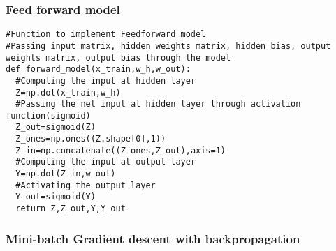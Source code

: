 \documentclass[12pt,letterpaper, onecolumn]{exam}
\begin{document}
 \newpage 
 \subsubsection*{ Feed forward model}

\begin{lstlisting}
#Function to implement Feedforward model
#Passing input matrix, hidden weights matrix, hidden bias, output weights matrix, output bias through the model   
def forward_model(x_train,w_h,w_out):
  #Computing the input at hidden layer
  Z=np.dot(x_train,w_h)
  #Passing the net input at hidden layer through activation function(sigmoid)
  Z_out=sigmoid(Z)
  Z_ones=np.ones((Z.shape[0],1))
  Z_in=np.concatenate((Z_ones,Z_out),axis=1)
  #Computing the input at output layer
  Y=np.dot(Z_in,w_out)
  #Activating the output layer
  Y_out=sigmoid(Y)
  return Z,Z_out,Y,Y_out

\end{lstlisting}


\subsubsection*{Mini-batch Gradient descent with backpropagation }
\end{document}
